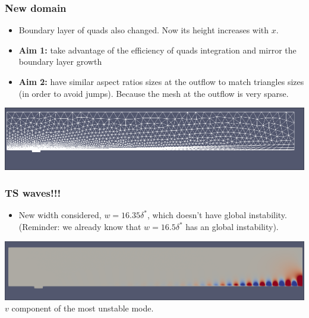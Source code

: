 \documentclass[
	aspectratio=169, %
	t, %
	onlytextwidth, %
	10pt, %
]{beamer}
\begin{document}
\begin{frame}
	\frametitle{New domain}

  \begin{itemize}
		\item Boundary layer of quads also changed. Now its height increases with $x$.
		\item \textbf{Aim 1:} take advantage of the efficiency of quads integration and mirror the boundary layer growth
		\item \textbf{Aim 2:} have similar aspect ratios sizes at the outflow to match triangles sizes (in order to avoid jumps). Because the mesh at the outflow is very sparse.
	\end{itemize}

	{
	\centering
	\includegraphics[width=\linewidth]{Images/domain.png}
	}

	
\end{frame}
\begin{frame}
	\frametitle{TS waves!!!}
	
	\begin{itemize}
		\item New width considered, $w=16.35 \delta^*$, which doesn't have global instability. (Reminder: we already know that $w=16.5 \delta^*$ has an global instability).
	\end{itemize}

	{
	\centering
	\includegraphics[width=\linewidth]{Images/v_TS.png}
	$v$ component of the most unstable mode.
	}

\end{frame}
\end{document}
